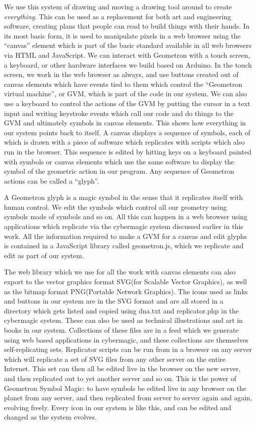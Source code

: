 We use this system of drawing and moving a drawing tool around to create
\emph{everything}. This can be used as a replacement for both art and
engineering software, creating plans that people can read to build
things with their hands. In its most basic form, it is used to
manipulate pixels in a web browser using the ``canvas'' element which is
part of the basic standard available in all web browsers via HTML and
JavaScript. We can interact with Geometron with a touch screen, a
keyboard, or other hardware interfaces we build based on Arduino. In the
touch screen, we work in the web browser as always, and use buttons
created out of canvas elements which have events tied to them which
control the ``Geometron virtual machine'', or GVM, which is part of the
code in our system. We can also use a keyboard to control the actions of
the GVM by putting the cursor in a text input and writing keystroke
events which call our code and do things to the GVM and ultimately
symbols in canvas elements. This shows how everything in our system
points back to itself. A canvas displays a sequence of symbols, each of
which is drawn with a piece of software which replicates with scripts
which also run in the browser. This sequence is edited by hitting keys
on a keyboard painted with symbols or canvas elements which use the same
software to display the symbol of the geometric action in our program.
Any sequence of Geometron actions can be called a ``glyph''.

A Geometron glyph is a magic symbol in the sense that it replicates
itself with human control. We edit the symbols which control all our
geometry using symbols made of symbols and so on. All this can happen in
a web browser using applications which replicate via the cybermagic
system discussed earlier in this work. All the information required to
make a GVM for a canvas and edit glyphs is contained in a JavaScript
library called geometron.js, which we replicate and edit as part of our
system.

The web library which we use for all the work with canvas elements can
also export to the vector graphics format SVG(for Scalable Vector
Graphics), as well as the bitmap format PNG(Portable Network Graphics).
The icons used as links and buttons in our system are in the SVG format
and are all stored in a directory which gets listed and copied using
dna.txt and replicator.php in the cybermagic system. These can also be
used as technical illustrations and art in books in our system.
Collections of these files are in a feed which we generate using web
based applications in cybermagic, and these collections are themselves
self-replicating sets. Replicator scripts can be run from in a browser
on any server which will replicate a set of SVG files from any other
server on the entire Internet. This set can then all be edited live in
the browser on the new server, and then replicated out to yet another
server and so on. This is the power of Geometron Symbol Magic: to have
symbols be edited live in any browser on the planet from any server, and
then replicated from server to server again and again, evolving freely.
Every icon in our system is like this, and can be edited and changed as
the system evolves.

